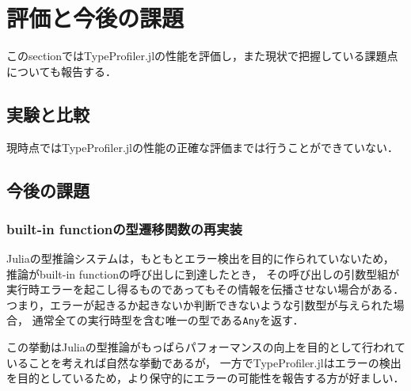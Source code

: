 
\section{評価と今後の課題} \label{section:4}

このsectionではTypeProfiler.jlの性能を評価し，また現状で把握している課題点についても報告する．

\subsection{実験と比較} \label{subsection:experiments-and-comparison}

現時点ではTypeProfiler.jlの性能の正確な評価までは行うことができていない．


\subsection{今後の課題} \label{subsection:issues}


\subsubsection{built-in functionの型遷移関数の再実装}

Juliaの型推論システムは，もともとエラー検出を目的に作られていないため，
推論がbuilt-in functionの呼び出しに到達したとき，
その呼び出しの引数型組が実行時エラーを起こし得るものであってもその情報を伝播させない場合がある．
つまり，エラーが起きるか起きないか判断できないような引数型が与えられた場合，
通常全ての実行時型を含む唯一の型である\verb|Any|を返す．

この挙動はJuliaの型推論がもっぱらパフォーマンスの向上を目的として行われていることを考えれば自然な挙動であるが，
一方でTypeProfiler.jlはエラーの検出を目的としているため，より保守的にエラーの可能性を報告する方が好ましい．

